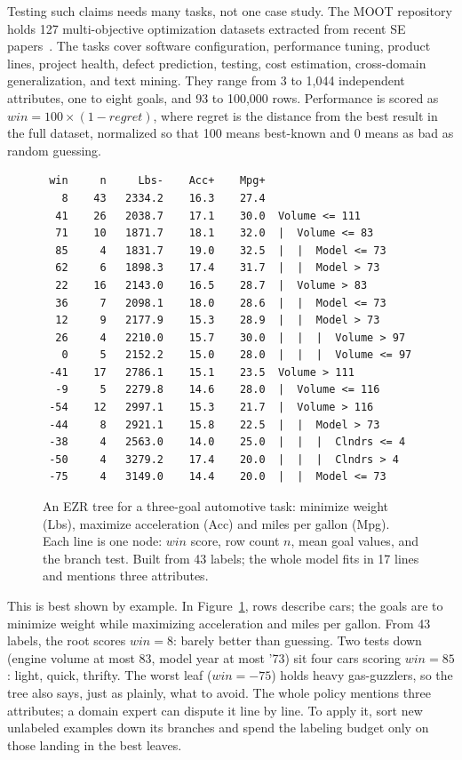 \documentclass[10pt,conference]{IEEEtran}
\begin{document}
Testing such claims needs many tasks, not one case study. The MOOT
repository holds 127 multi-objective optimization datasets extracted
from recent SE papers~\cite{moot26}. The tasks cover software configuration, performance
tuning, product lines, project health, defect prediction, testing,
cost estimation, cross-domain generalization, and text mining. They
range from 3 to 1,044 independent attributes, one to eight goals, and
93 to 100,000 rows. Performance is scored as
$\mathit{win}=100\times(1-\mathit{regret})$, where regret is the
distance from the best result in the full dataset, normalized so that
100 means best-known and 0 means as bad as random guessing.

\begin{figure}[t]
\begin{scriptsize}
\begin{verbatim}
 win     n     Lbs-    Acc+    Mpg+
   8    43   2334.2    16.3    27.4
  41    26   2038.7    17.1    30.0  Volume <= 111
  71    10   1871.7    18.1    32.0  |  Volume <= 83
  85     4   1831.7    19.0    32.5  |  |  Model <= 73
  62     6   1898.3    17.4    31.7  |  |  Model > 73
  22    16   2143.0    16.5    28.7  |  Volume > 83
  36     7   2098.1    18.0    28.6  |  |  Model <= 73
  12     9   2177.9    15.3    28.9  |  |  Model > 73
  26     4   2210.0    15.7    30.0  |  |  |  Volume > 97
   0     5   2152.2    15.0    28.0  |  |  |  Volume <= 97
 -41    17   2786.1    15.1    23.5  Volume > 111
  -9     5   2279.8    14.6    28.0  |  Volume <= 116
 -54    12   2997.1    15.3    21.7  |  Volume > 116
 -44     8   2921.1    15.8    22.5  |  |  Model > 73
 -38     4   2563.0    14.0    25.0  |  |  |  Clndrs <= 4
 -50     4   3279.2    17.4    20.0  |  |  |  Clndrs > 4
 -75     4   3149.0    14.4    20.0  |  |  Model <= 73
\end{verbatim}
\end{scriptsize}
\caption{An EZR tree for a three-goal automotive task: minimize
weight (Lbs), maximize acceleration (Acc) and miles per gallon
(Mpg). Each line is one node: $\mathit{win}$ score, row count $n$,
mean goal values, and the branch test. Built from 43 labels; the
whole model fits in 17 lines and mentions three attributes.}
\label{fig:tree}
\end{figure}

This is best shown by example. In Figure~\ref{fig:tree}, rows
describe cars; the goals are to minimize weight while maximizing
acceleration and miles per gallon. From 43 labels, the root scores
$\mathit{win}=8$: barely better than guessing. Two tests down (engine
volume at most 83, model year at most '73) sit four cars scoring
$\mathit{win}=85$: light, quick, thrifty. The worst leaf
($\mathit{win}=-75$) holds heavy gas-guzzlers, so the tree also says,
just as plainly, what to avoid. The whole policy mentions three
attributes; a domain expert can dispute it line by line. To apply it,
sort new unlabeled examples down its branches and spend the labeling
budget only on those landing in the best leaves.
\end{document}

